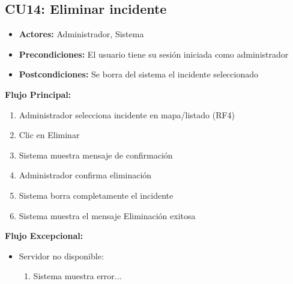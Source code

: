 \begin{multicols}{2}
\subsection*{CU14: Eliminar incidente}
\begin{itemize}
    \item \textbf{Actores:} Administrador, Sistema
    \item \textbf{Precondiciones:} El usuario tiene su sesión iniciada como administrador
    \item \textbf{Postcondiciones:} Se borra del sistema el incidente seleccionado
\end{itemize}
\textbf{Flujo Principal:}
\begin{enumerate}
     \item Administrador selecciona incidente en mapa/listado (RF4)
    \item Clic en Eliminar
    \item Sistema muestra mensaje de confirmación
    \item Administrador confirma eliminación
    \item Sistema borra completamente el incidente
    \item Sistema muestra el mensaje Eliminación exitosa
\end{enumerate}

\textbf{Flujo Excepcional:}
\begin{itemize}
    \item Servidor no disponible:
    \begin{enumerate}
        \item Sistema muestra error...
    \end{enumerate}
\end{itemize}


\end{multicols}
